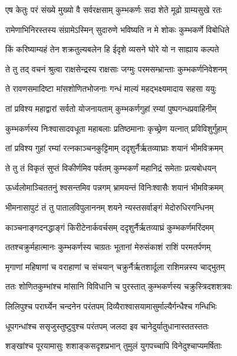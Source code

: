 \twolineshloka
{एष केतुः परं संख्ये मुख्यो वै सर्वरक्षसाम्}
{कुम्भकर्णः सदा शेते मूढो ग्राम्यसुखे रतः} %

\twolineshloka
{रामेणाभिनिरस्तस्य संग्रामेऽस्मिन् सुदारुणे}
{भविष्यति न मे शोकः कुम्भकर्णे विबोधिते} %

\twolineshloka
{किं करिष्याम्यहं तेन शक्रतुल्यबलेन हि}
{ईदृशे व्यसने घोरे यो न साह्याय कल्पते} %

\twolineshloka
{ते तु तद् वचनं श्रुत्वा राक्षसेन्द्रस्य राक्षसाः}
{जग्मुः परमसम्भ्रान्ताः कुम्भकर्णनिवेशनम्} %

\twolineshloka
{ते रावणसमादिष्टा मांसशोणितभोजनाः}
{गन्धं माल्यं महद्भक्ष्यमादाय सहसा ययुः} %

\twolineshloka
{तां प्रविश्य महाद्वारां सर्वतो योजनायताम्}
{कुम्भकर्णगुहां रम्यां पुष्पगन्धप्रवाहिनीम्} %

\twolineshloka
{कुम्भकर्णस्य निःश्वासादवधूता महाबलाः}
{प्रतिष्ठमानाः कृच्छ्रेण यत्नात् प्रविविशुर्गुहाम्} %

\twolineshloka
{तां प्रविश्य गुहां रम्यां रत्नकाञ्चनकुट्टिमाम्}
{ददृशुर्नैर्ऋतव्याघ्राः शयानं भीमविक्रमम्} %

\twolineshloka
{ते तु तं विकृतं सुप्तं विकीर्णमिव पर्वतम्}
{कुम्भकर्णं महानिद्रं समेताः प्रत्यबोधयन्} %

\twolineshloka
{ऊर्ध्वलोमाञ्चिततनुं श्वसन्तमिव पन्नगम्}
{भ्रामयन्तं विनिःश्वासैः शयानं भीमविक्रमम्} %

\twolineshloka
{भीमनासापुटं तं तु पातालविपुलाननम्}
{शयने न्यस्तसर्वाङ्गं मेदोरुधिरगन्धिनम्} %

\twolineshloka
{काञ्चनाङ्गदनद्धाङ्गं किरीटेनार्कवर्चसम्}
{ददृशुर्नैर्ऋतव्याघ्रं कुम्भकर्णमरिंदमम्} %

\twolineshloka
{ततश्चक्रुर्महात्मानः कुम्भकर्णस्य चाग्रतः}
{भूतानां मेरुसंकाशं राशिं परमतर्पणम्} %

\twolineshloka
{मृगाणां महिषाणां च वराहाणां च संचयान्}
{चक्रुर्नैर्ऋतशार्दूला राशिमन्नस्य चाद्भुतम्} %

\twolineshloka
{ततः शोणितकुम्भांश्च मांसानि विविधानि च}
{पुरस्तात् कुम्भकर्णस्य चक्रुस्त्रिदशशत्रवः} %

\twolineshloka
{लिलिपुश्च परार्घ्येन चन्दनेन परंतपम्}
{दिव्यैराश्वासयामासुर्माल्यैर्गन्धैश्च गन्धिभिः} %

\twolineshloka
{धूपगन्धांश्च ससृजुस्तुष्टुवुश्च परंतपम्}
{जलदा इव चानेदुर्यातुधानास्ततस्ततः} %

\twolineshloka
{शङ्खांश्च पूरयामासुः शशाङ्कसदृशप्रभान्}
{तुमुलं युगपच्चापि विनेदुश्चाप्यमर्षिताः} %

